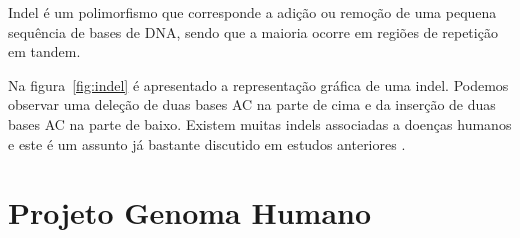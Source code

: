 Indel é um polimorfismo que corresponde a adição ou remoção de uma pequena sequência de bases de DNA, sendo que a maioria ocorre em regiões de repetição em tandem.

Na figura~\ref{fig:indel} é apresentado a representação gráfica de uma indel. Podemos observar uma deleção de duas bases AC na parte de cima e da inserção de duas bases AC na parte de baixo. Existem muitas indels associadas a doenças humanos e este é um assunto já bastante discutido em estudos anteriores \cite{Taylor2004, Haraksingh2013}.



\section{Projeto Genoma Humano}

